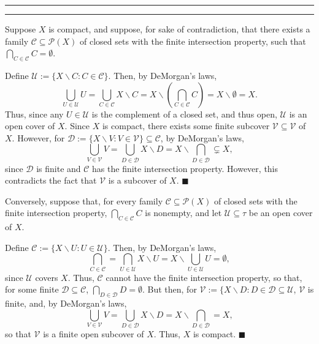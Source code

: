 \documentclass[11pt]{article}
\newcounter{questionCounter}
\newcounter{partCounter}[questionCounter]
\newenvironment{question}[2][\arabic{questionCounter}]{%
    \setcounter{partCounter}{0}%
    \vspace{.25in} \hrule \vspace{0.5em}%
        \noindent{\bf #2}%
    \vspace{0.8em} \hrule \vspace{.10in}%
    \addtocounter{questionCounter}{1}%
}{}
\renewcommand{\qed}{\quad $\blacksquare$}
\newcommand{\sminus}{\backslash}
\newcommand{\pow}[1]{\mathcal{P}\left(#1\right)} %
\begin{document}
\begin{question}{Problem 5}
Suppose $X$ is compact, and suppose, for sake of contradiction, that there
exists a family $\mathcal{C} \subseteq \pow{X}$ of closed sets with the finite
intersection property, such that $\bigcap_{C \in \mathcal{C}} C = \emptyset$.

Define $\mathcal{U} := \{ X \sminus C : C \in \mathcal{C}\}$. Then, by
DeMorgan's laws,
\[\bigcup_{U \in \mathcal{U}} U
 = \bigcup_{C \in \mathcal{C}} X \sminus C
 = X \sminus \left( \bigcap_{C \in \mathcal{C}} C \right)
 = X \sminus \emptyset
 = X.
\]
Thus, since any $U \in \mathcal{U}$ is the complement of a closed set, and
thus open, $\mathcal{U}$ is an open cover of $X$. Since $X$ is compact, there
exists some finite subcover $\mathcal{V} \subseteq \mathcal{V}$ of $X$.
However, for
$\mathcal{D} := \{X \sminus V : V \in \mathcal{V}\} \subseteq \mathcal{C}$,
by DeMorgan's laws,
\[\bigcup_{V \in \mathcal{V}} V
 = \bigcup_{D \in \mathcal{D}} X \sminus D
 = X \sminus \bigcap_{D \in \mathcal{D}}
 \subsetneq X,
\]
since $\mathcal{D}$ is finite and $\mathcal{C}$ has the
finite intersection property. However, this contradicts the fact that
$\mathcal{V}$ is a subcover of $X$. \qed

Conversely, suppose that, for every family $\mathcal{C} \subseteq \pow{X}$ of
closed sets with the finite intersection property,
$\bigcap_{C \in \mathcal{C}} C$ is nonempty, and let
$\mathcal{U} \subseteq \tau$ be an open cover of $X$.

Define $\mathcal{C} := \{X \sminus U : U \in \mathcal{U}\}$. Then, by
DeMorgan's laws,
\[\bigcap_{C \in \mathcal{C}}
 = \bigcap_{U \in \mathcal{U}} X \sminus U
 = X \sminus \bigcup_{U \in \mathcal{U}} U
 = \emptyset,
\]
since $\mathcal{U}$ covers $X$. Thus, $\mathcal{C}$ cannot have the finite
intersection property, so that, for some finite
$\mathcal{D} \subseteq \mathcal{C}$,
$\bigcap_{D \in \mathcal{D}} D = \emptyset$.
But then, for
$\mathcal{V} := \{X \sminus D : D \in \mathcal{D} \subseteq \mathcal{U}$,
$\mathcal{V}$ is finite, and, by DeMorgan's laws,
\[\bigcup_{V \in \mathcal{V}} V
 = \bigcup_{D \in \mathcal{D}} X \sminus D
 = X \sminus \bigcap_{D \in \mathcal{D}}
 = X,
\]
so that $\mathcal{V}$ is a finite open subcover of $X$. Thus, $X$ is compact.
\qed

\end{question}
\end{document}
